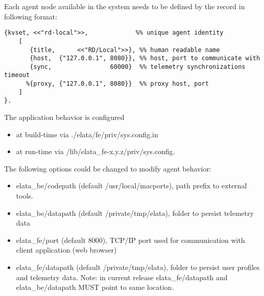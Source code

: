 Each agent node available in the system needs to be defined by the record in following format: 
\begin{verbatim}
{kvset, <<"rd-local">>,             %% unique agent identity
    [
       {title,      <<"RD/Local">>}, %% human readable name
       {host,  {"127.0.0.1", 8080}}, %% host, port to communicate with
       {sync,                60000}  %% telemetry synchronizations timeout
      %{proxy, {"127.0.0.1", 8080}}  %% proxy host, port 
    ]
}.
\end{verbatim}


The application behavior is configured
\begin{itemize}
\item at build-time via ./elata/fe/priv/sys.config.in
\item at run-time via  /lib/elata\_fe-x.y.z/priv/sys.config.
\end{itemize}


The following options could be changed to modify agent behavior: 
\begin{itemize}
\item elata\_be/codepath (default /usr/local/macports), path prefix to external tools.
\item elata\_be/datapath (default /private/tmp/elata), folder to persist telemetry data
\item elata\_fe/port (default 8000), TCP/IP port used for communication with client application (web browser)
\item elata\_fe/datapath (default /private/tmp/elata), folder to persist user profiles and telemetry data. Note: in current release elata\_fe/datapath and elata\_be/datapath MUST point to same location.
\end{itemize}



